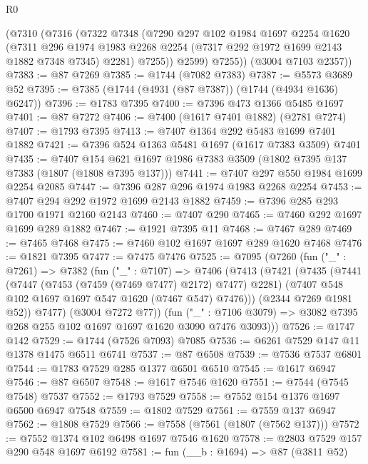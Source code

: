 \begin{lexlean}{R0}
\begin{coremodule}
        (@7310
          (@7316
            (@7322
              @7348
              (@7290
                @297
                @102
                @1984
                @1697
                @2254
                @1620
                (@7311
                  @296
                  @1974
                  @1983
                  @2268
                  @2254
                  (@7317 @292 @1972 @1699 @2143 @1882 @7348 @7345)
                  @2281)
                @7255))
            @2599)
          @7255))
      (@3004 @7103 @2357))
@7383 := @87 @7269
@7385 := @1744 (@7082 @7383)
@7387 := @5573 @3689 @52
@7395 := @7385 (@1744 (@4931 (@87 @7387)) (@1744 (@4934 @1636) @6247))
@7396 := @1783 @7395
@7400 := @7396 @473 @1366 @5485 @1697
@7401 := @87 @7272
@7406 := @7400 (@1617 @7401 @1882) (@2781 @7274)
@7407 := @1793 @7395
@7413 := @7407 @1364 @292 @5483 @1699 @7401 @1882
@7421 := @7396 @524 @1363 @5481 @1697 (@1617 @7383 @3509) @7401
@7435 := @7407 @154 @621 @1697 @1986 @7383 @3509 (@1802 @7395 @137 @7383 (@1807 (@1808 @7395 @137)))
@7441 := @7407 @297 @550 @1984 @1699 @2254 @2085
@7447 := @7396 @287 @296 @1974 @1983 @2268 @2254
@7453 := @7407 @294 @292 @1972 @1699 @2143 @1882
@7459 := @7396 @285 @293 @1700 @1971 @2160 @2143
@7460 := @7407 @290
@7465 := @7460 @292 @1697 @1699 @289 @1882
@7467 := @1921 @7395 @11
@7468 := @7467 @289
@7469 := @7465 @7468
@7475 := @7460 @102 @1697 @1697 @289 @1620 @7468
@7476 := @1821 @7395
@7477 := @7475 @7476
@7525 := @7095
    (@7260
      (fun ("_" : @7261) =>
      @7382
        (fun ("_" : @7107) =>
        @7406
          (@7413
            (@7421
              (@7435
                (@7441
                  (@7447 (@7453 (@7459 (@7469 @7477) @2172) @7477) @2281)
                  (@7407 @548 @102 @1697 @1697 @547 @1620 (@7467 @547) @7476)))
              (@2344 @7269 @1981 @52))
            @7477)
          (@3004 @7272 @77))
        (fun ("_" : @7106 @3079) =>
        @3082 @7395 @268 @255 @102 @1697 @1697 @1620 @3090 @7476 @3093)))
@7526 := @1747 @142
@7529 := @1744 (@7526 @7093) @7085
@7536 := @6261 @7529 @147 @11 @1378 @1475 @6511 @6741
@7537 := @87 @6508
@7539 := @7536 @7537 @6801
@7544 := @1783 @7529 @285 @1377 @6501 @6510
@7545 := @1617 @6947
@7546 := @87 @6507
@7548 := @1617 @7546 @1620
@7551 := @7544 (@7545 @7548) @7537
@7552 := @1793 @7529
@7558 := @7552 @154 @1376 @1697 @6500 @6947 @7548
@7559 := @1802 @7529
@7561 := @7559 @137 @6947
@7562 := @1808 @7529
@7566 := @7558 (@7561 (@1807 (@7562 @137)))
@7572 := @7552 @1374 @102 @6498 @1697 @7546 @1620
@7578 := @2803 @7529 @157 @290 @548 @1697 @6192
@7581 := fun (__b : @1694) => @87 (@3811 @52)

\end{coremodule}
\end{lexlean}
